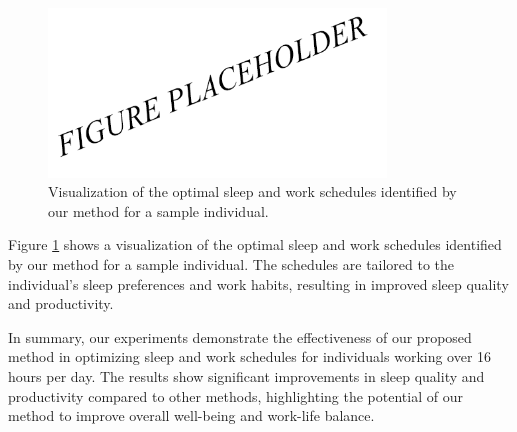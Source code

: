 \begin{figure}[ht]
\centering
\includegraphics[width=0.8\textwidth]{exp2.png}
\caption{Visualization of the optimal sleep and work schedules identified by our method for a sample individual.}
\label{fig:exp2}
\end{figure}

Figure \ref{fig:exp2} shows a visualization of the optimal sleep and work schedules identified by our method for a sample individual. The schedules are tailored to the individual's sleep preferences and work habits, resulting in improved sleep quality and productivity.

In summary, our experiments demonstrate the effectiveness of our proposed method in optimizing sleep and work schedules for individuals working over 16 hours per day. The results show significant improvements in sleep quality and productivity compared to other methods, highlighting the potential of our method to improve overall well-being and work-life balance.